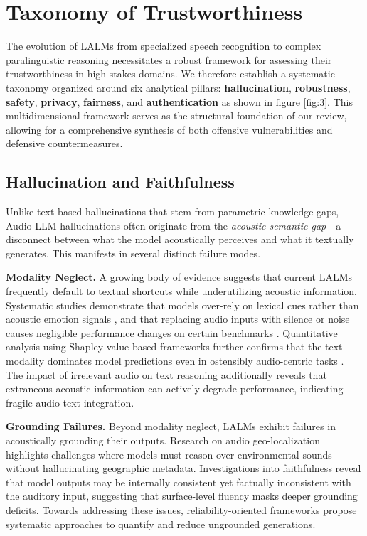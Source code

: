 \section{Taxonomy of Trustworthiness}

The evolution of LALMs from specialized speech recognition to complex paralinguistic reasoning necessitates a robust framework for assessing their trustworthiness in high-stakes domains. We therefore establish a systematic taxonomy organized around six analytical pillars: \textbf{hallucination}, \textbf{robustness}, \textbf{safety}, \textbf{privacy}, \textbf{fairness}, and \textbf{authentication} as shown in figure \ref{fig:3}. This multidimensional framework serves as the structural foundation of our review, allowing for a comprehensive synthesis of both offensive vulnerabilities and defensive countermeasures.

\subsection{Hallucination and Faithfulness}
Unlike text-based hallucinations that stem from parametric knowledge gaps, Audio LLM hallucinations often originate from the \textit{acoustic-semantic gap}---a disconnect between what the model acoustically perceives and what it textually generates. This manifests in several distinct failure modes.

\textbf{Modality Neglect.} A growing body of evidence suggests that current LALMs frequently default to textual shortcuts while underutilizing acoustic information. Systematic studies demonstrate that models over-rely on lexical cues rather than acoustic emotion signals \cite{chen2025audio}, and that replacing audio inputs with silence or noise causes negligible performance changes on certain benchmarks \cite{wang2025audio}. Quantitative analysis using Shapley-value-based frameworks further confirms that the text modality dominates model predictions even in ostensibly audio-centric tasks \cite{morais2025investigating}. The impact of irrelevant audio on text reasoning \cite{li2025silence} additionally reveals that extraneous acoustic information can actively degrade performance, indicating fragile audio-text integration.

\textbf{Grounding Failures.} Beyond modality neglect, LALMs exhibit failures in acoustically grounding their outputs. Research on audio geo-localization \cite{zhang2026sonar} highlights challenges where models must reason over environmental sounds without hallucinating geographic metadata. Investigations into faithfulness \cite{jain2025investigating} reveal that model outputs may be internally consistent yet factually inconsistent with the auditory input, suggesting that surface-level fluency masks deeper grounding deficits. Towards addressing these issues, reliability-oriented frameworks \cite{ma2025towards} propose systematic approaches to quantify and reduce ungrounded generations.


